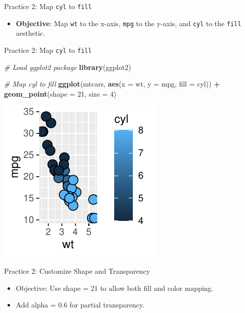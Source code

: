 \documentclass[
  ignorenonframetext,
]{beamer}
\newenvironment{Shaded}{\begin{snugshade}}{\end{snugshade}}
\newcommand{\AttributeTok}[1]{\textcolor[rgb]{0.13,0.29,0.53}{#1}}
\newcommand{\CommentTok}[1]{\textcolor[rgb]{0.56,0.35,0.01}{\textit{#1}}}
\newcommand{\DecValTok}[1]{\textcolor[rgb]{0.00,0.00,0.81}{#1}}
\newcommand{\FunctionTok}[1]{\textcolor[rgb]{0.13,0.29,0.53}{\textbf{#1}}}
\newcommand{\NormalTok}[1]{#1}
\newcommand{\SpecialCharTok}[1]{\textcolor[rgb]{0.81,0.36,0.00}{\textbf{#1}}}
\providecommand{\tightlist}{%
  \setlength{\itemsep}{0pt}\setlength{\parskip}{0pt}}
\begin{document}
\begin{frame}[fragile]{Practice 2: Map \texttt{cyl} to \texttt{fill}}
\label{practice-2-map-cyl-to-fill}
\begin{itemize}
\tightlist
\item
  \textbf{Objective}: Map \texttt{wt} to the x-axis, \texttt{mpg} to the
  y-axis, and \texttt{cyl} to the \texttt{fill} aesthetic.
\end{itemize}
\end{frame}

\begin{frame}[fragile]{Practice 2: Map \texttt{cyl} to \texttt{fill}}
\label{practice-2-map-cyl-to-fill-1}

\begin{Shaded}
\begin{Highlighting}[]
\CommentTok{\# Load ggplot2 package}
\FunctionTok{library}\NormalTok{(ggplot2)}

\CommentTok{\# Map cyl to fill}
\FunctionTok{ggplot}\NormalTok{(mtcars, }\FunctionTok{aes}\NormalTok{(}\AttributeTok{x =}\NormalTok{ wt, }\AttributeTok{y =}\NormalTok{ mpg, }\AttributeTok{fill =}\NormalTok{ cyl)) }\SpecialCharTok{+} \FunctionTok{geom\_point}\NormalTok{(}\AttributeTok{shape =} \DecValTok{21}\NormalTok{,}
    \AttributeTok{size =} \DecValTok{4}\NormalTok{)}
\end{Highlighting}
\end{Shaded}

\begin{center}\includegraphics[width=0.5\linewidth]{Figs/unnamed-chunk-14-1} \end{center}
\end{frame}

\begin{frame}{Practice 2: Customize Shape and Transparency}
\label{practice-2-customize-shape-and-transparency}
\begin{itemize}
\item
  Objective: Use shape = 21 to allow both fill and color mapping.
\item
  Add alpha = 0.6 for partial transparency.
\end{itemize}
\end{frame}
\end{document}
